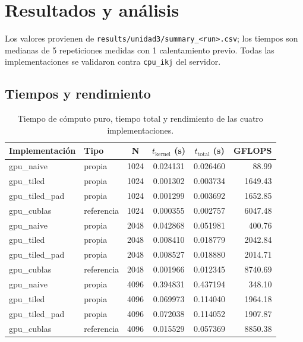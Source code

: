 \section{Resultados y análisis}
\label{sec:res-u3}

	Los valores provienen de \texttt{results/unidad3/summary\_\textless run\textgreater{}.csv}; los tiempos son medianas de 5 repeticiones medidas con 1 calentamiento previo. Todas las implementaciones se validaron contra \texttt{cpu\_ikj} del servidor.

\subsection{Tiempos y rendimiento}

	\begin{table}[H]
		\centering
		\caption{Tiempo de cómputo puro, tiempo total y rendimiento de las cuatro implementaciones.}
		\begin{tabular}{llcccr}
			\hline
			\textbf{Implementación} & \textbf{Tipo} & \textbf{N} & \textbf{$t_{\text{kernel}}$ (s)} & \textbf{$t_{\text{total}}$ (s)} & \textbf{GFLOPS} \bigstrut\\
			\hline
			gpu\_naive & propia & 1024 & 0.024131 & 0.026460 & 88.99 \\
			gpu\_tiled & propia & 1024 & 0.001302 & 0.003734 & 1649.43 \\
			gpu\_tiled\_pad & propia & 1024 & 0.001299 & 0.003692 & 1652.85 \\
			gpu\_cublas & referencia & 1024 & 0.000355 & 0.002757 & 6047.48 \\
			gpu\_naive & propia & 2048 & 0.042868 & 0.051981 & 400.76 \\
			gpu\_tiled & propia & 2048 & 0.008410 & 0.018779 & 2042.84 \\
			gpu\_tiled\_pad & propia & 2048 & 0.008527 & 0.018880 & 2014.71 \\
			gpu\_cublas & referencia & 2048 & 0.001966 & 0.012345 & 8740.69 \\
			gpu\_naive & propia & 4096 & 0.394831 & 0.437194 & 348.10 \\
			gpu\_tiled & propia & 4096 & 0.069973 & 0.114040 & 1964.18 \\
			gpu\_tiled\_pad & propia & 4096 & 0.072038 & 0.114052 & 1907.87 \\
			gpu\_cublas & referencia & 4096 & 0.015529 & 0.057369 & 8850.38 \bigstrut[b]\\
			\hline
		\end{tabular}
		\label{tab:resultados-u3}
	\end{table}

